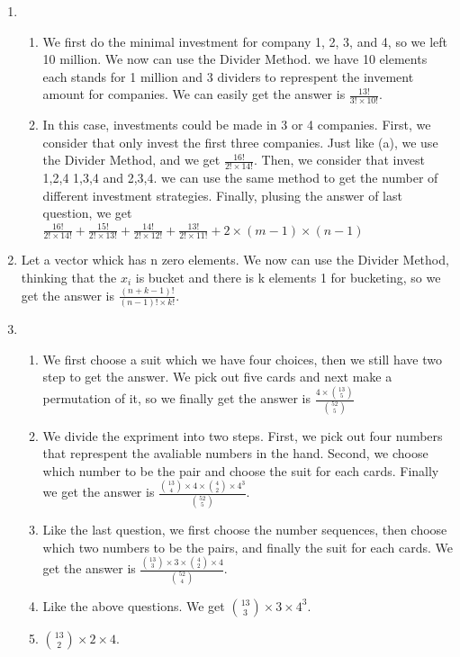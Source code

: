 \documentclass{article}
\begin{document}
\begin{enumerate}
	\item
	\begin{enumerate}
	\item We first do the minimal investment for company 1, 2, 3, and 4, so we left 10 million. We now can use the Divider Method. we have 10 elements each stands for 1 million and 3 dividers to represpent the invement amount for companies. We can easily get the answer is $\frac{13!}{3!\times10!}$.
	\item In this case, investments could be made in 3 or 4 companies. First, we consider that only invest the first three companies. Just like (a), we use the Divider Method, and we get $\frac{16!}{2!\times14!}$. Then, we consider that invest 1,2,4  1,3,4 and 2,3,4. we can use the same method to get the number of different investment strategies. Finally, plusing the answer of last question, we get $\frac{16!}{2!\times14!}+\frac{15!}{2!\times13!}+\frac{14!}{2!\times12!}+\frac{13!}{2!\times11!}+2\times(m-1)\times(n-1)$
	\end{enumerate}
	\item Let a vector whick has n zero elements. We now can use the Divider Method, thinking that the $x_i$ is bucket and there is k elements 1 for bucketing, so we get the answer is $\frac{(n+k-1)!}{(n-1)!\times k!}$.
\newpage
	\item
	\begin{enumerate}
	\item We first choose a suit which we have four choices, then we still have two step to get the answer. We pick out five cards and next make a permutation of it, so we finally get the answer is $\frac{4\times{13 \choose 5}}{{52 \choose 5}}$
	\item We divide the expriment into two steps. First, we pick out four numbers that represpent the avaliable numbers in the hand. Second, we choose which number to be the pair and choose the suit for each cards. Finally we get the answer is $\frac{{13 \choose 4}\times 4 \times {4 \choose 2} \times 4^3 }{{52 \choose 5}}$.
	\item Like the last question, we first choose the number sequences, then choose which two numbers to be the pairs, and finally the suit for each cards. We get the answer is $\frac{{13 \choose 3}\times 3 \times {4 \choose 2} \times 4 }{{52 \choose 4}}$.
	\item Like the above questions. We get ${13 \choose 3}\times 3 \times 4^3$.
	\item ${13 \choose 2}\times 2\times 4$.
	\end{enumerate}

\end{enumerate}
\end{document}
